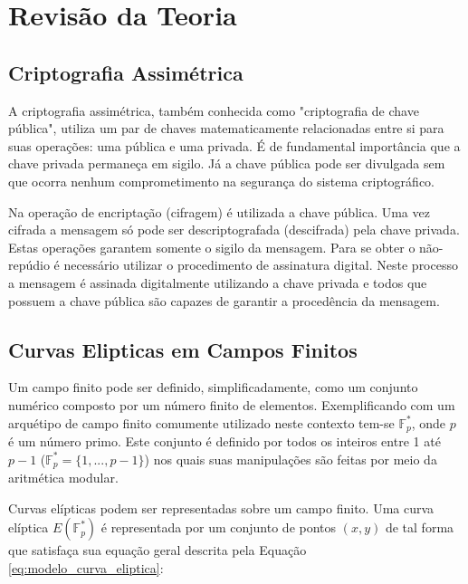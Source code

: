 \documentclass[12pt]{article}
\begin{document}
    \section{Revisão da Teoria}
    \label{sec:revisao_da_teoria}
    
        \subsection{Criptografia Assimétrica}
        \label{subsec:criptografia_assimetrica}

            A criptografia assimétrica, também conhecida como "criptografia de chave pública", utiliza um par de chaves matematicamente relacionadas entre si para suas operações: uma pública e uma privada. É de fundamental importância que a chave privada permaneça em sigilo. Já a chave pública pode ser divulgada sem que ocorra nenhum comprometimento na segurança do sistema criptográfico.

            Na operação de encriptação (cifragem) é utilizada a chave pública. Uma vez cifrada a mensagem só pode ser descriptografada (descifrada) pela chave privada. Estas operações garantem somente o sigilo da mensagem. Para se obter o não-repúdio é necessário utilizar o procedimento de assinatura digital. Neste processo a mensagem é assinada digitalmente utilizando a chave privada e todos que possuem a chave pública são capazes de garantir a procedência da mensagem.

        \subsection{Curvas Elipticas em Campos Finitos}
        \label{subsec:campos_finitos}

            Um campo finito pode ser definido, simplificadamente, como um conjunto numérico composto por um número finito de elementos. Exemplificando com um arquétipo de campo finito comumente utilizado neste contexto tem-se $\mathbb{F}^*_p$, onde $p$ é um número primo. Este conjunto é definido por todos os inteiros entre 1 até $p-1$ ($\mathbb{F}^*_p = \{1, ... , p-1\}$) nos quais suas manipulações são feitas por meio da aritmética modular.
            
            Curvas elípticas podem ser representadas sobre um campo finito. Uma curva elíptica $E(\mathbb{F}^*_p)$ é representada por um conjunto de pontos $(x, y)$ de tal forma que satisfaça sua equação geral descrita pela Equação \ref{eq:modelo_curva_eliptica}:
\end{document}
